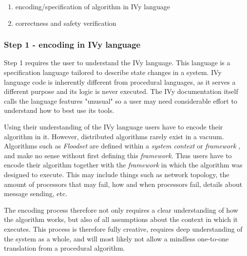 \documentclass[fleqn]{article}
\begin{document}
\begin{enumerate}
  \item encoding/specification of algorithm in IVy language
  \item correctness and safety verification
\end{enumerate}

\subsubsection{Step 1 - encoding in IVy language}
Step 1 requires the user to understand the IVy language. This language is a specification language tailored to describe state changes in a system. IVy language code is inherently different from procedural languages, as it serves a different purpose and its logic is never executed. The IVy documentation itself calls the language features "unusual" \cite{refLanguageDoc} so a user may need considerable effort to understand how to best use its tools.

Using their understanding of the IVy language users have to encode their algorithm in it. However, distributed algorithms rarely exist in a vacuum. Algorithms such as \textit{Floodset} are defined within a \textit{system context} or \textit{framework} \cite{refNancy}, and make no sense without first defining this \textit{framework}. Thus users have to encode their algorithm together with the \textit{framework} in which the algorithm was designed to execute. This may include things such as network topology, the amount of processors that may fail, how and when processors fail, details about message sending, etc.

The encoding process therefore not only requires a clear understanding of how the algorithm works, but also of all assumptions about the context in which it executes. This process is therefore fully creative, requires deep understanding of the system as a whole, and will most likely not allow a mindless one-to-one translation from a procedural algorithm.
\end{document}
